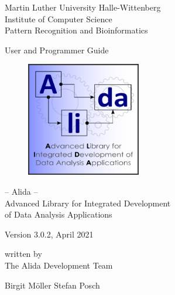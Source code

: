 
\thispagestyle{empty}

\begin{flushleft}
\large{Martin Luther University Halle-Wittenberg} \\
\normalsize{Institute of Computer Science} \\
\normalsize{Pattern Recognition and Bioinformatics}
\end{flushleft}

\vspace*{1cm}

\hrulefill

\vspace*{2cm}

\begin{center}

\large{User and Programmer Guide} \\
\vspace*{0.5cm}

  \begin{figure}[htbp]
    \centering
     \includegraphics[width = 5cm]{../images/Alida_logo.pdf}
  \end{figure}
\Large{
-- Alida -- \\ Advanced Library for Integrated Development \\ of Data Analysis Applications}

\vspace*{0.7cm}

\large{
Version 3.0.2, April 2021
}
\vspace*{0.5cm}

\normalsize{written by}\\
\vspace*{1.0cm}
\large{The Alida Development Team}\\
\vspace*{1.0cm}
\end{center}

\begin{center}
{\Large
       {Birgit M\"oller} \hspace*{1cm} {Stefan Posch} 
}
\end{center}

